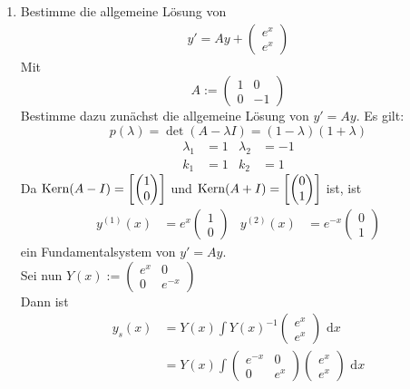 \documentclass[a4paper,oneside,DIV15,BCOR12mm,chapterprefix=true,headings=onelinechapter]{scrbook}
\begin{document}
\begin{enumerate}
\item Bestimme die allgemeine Lösung von 
\begin{align*} 
\tag{$\ast $} y' = Ay + \begin{pmatrix} e^x \\ e^x \end{pmatrix}
\end{align*}
Mit
\[A:=\begin{pmatrix} 1 & 0 \\ 0 & -1 \end{pmatrix}\]
Bestimme dazu zunächst die allgemeine Lösung von $y' = Ay$. Es gilt: 
\[p(\lambda)=\det(A-\lambda I) = (1-\lambda)(1+\lambda)\]
\begin{align*}
\lambda_1 &= 1 &\lambda_2 &= -1\\
k_1&=1&k_2&=1
\end{align*}
Da $\mathop{\rm Kern}\nolimits(A-I) = \left[ \begin{pmatrix} 1 \\ 0 \end{pmatrix} \right]$ und 
$\mathop{\rm Kern}\nolimits(A+I) = \left[ \begin{pmatrix} 0 \\ 1 \end{pmatrix} \right]$ ist, ist
\begin{align*}
y^{(1)}(x) &= e^x \begin{pmatrix} 1 \\ 0 \end{pmatrix} 
&y^{(2)}(x) &= e^{-x} \begin{pmatrix} 0 \\ 1 \end{pmatrix}
\end{align*}
ein Fundamentalsystem von $y' = Ay$.\\
Sei nun $Y(x) := \begin{pmatrix} e^x & 0 \\ 0 & e^{-x} \end{pmatrix}$ \\ 
Dann ist
\begin{align*}
y_s(x) &= Y(x) \int Y(x)^{-1} \begin{pmatrix} e^x \\ e^x \end{pmatrix} \text{ d}x\\ 
&= Y(x) \int \begin{pmatrix} e^{-x} & 0 \\ 0 & e^x \end{pmatrix} \begin{pmatrix} e^x \\ e^x \end{pmatrix} \text{ d}x\\ 

\end{align*}
\end{enumerate}
\end{document}
